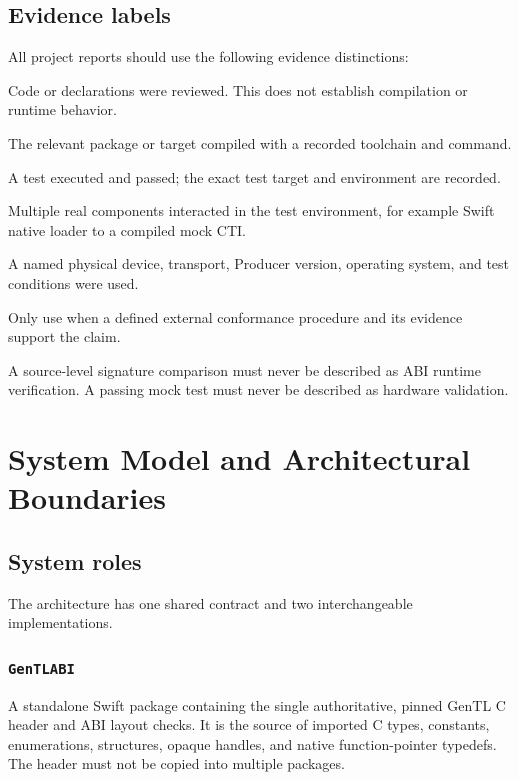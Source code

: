 \documentclass[11pt,a4paper]{report}
\begin{document}
\section{Evidence labels}
All project reports should use the following evidence distinctions:
\begin{description}[style=nextline]
  \item[Source inspected] Code or declarations were reviewed. This does not establish compilation or runtime behavior.
  \item[Compiled] The relevant package or target compiled with a recorded toolchain and command.
  \item[Unit tested] A test executed and passed; the exact test target and environment are recorded.
  \item[Integration tested] Multiple real components interacted in the test environment, for example Swift native loader to a compiled mock CTI.
  \item[Hardware tested] A named physical device, transport, Producer version, operating system, and test conditions were used.
  \item[Externally conformant] Only use when a defined external conformance procedure and its evidence support the claim.
\end{description}
A source-level signature comparison must never be described as ABI runtime verification. A passing mock test must never be described as hardware validation.

\chapter{System Model and Architectural Boundaries}

\section{System roles}
The architecture has one shared contract and two interchangeable implementations.

\subsection{\texttt{GenTLABI}}
A standalone Swift package containing the single authoritative, pinned GenTL C header and ABI layout checks. It is the source of imported C types, constants, enumerations, structures, opaque handles, and native function-pointer typedefs. The header must not be copied into multiple packages.
\end{document}
